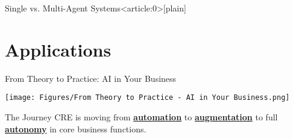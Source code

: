 \documentclass{beamer}
\begin{document}
    



{ %
    \begin{frame}{Single vs. Multi-Agent Systems}<article:0>[plain]
     \end{frame}
}




\section{Applications}

\begin{frame}{From Theory to Practice: AI in Your Business}
  \centering

  \centering
  \texttt{[image: Figures/From Theory to Practice - AI in Your Business.png]}\\
  

  \vspace{0.25cm}
  \begin{block}{The Journey}
    CRE is moving from \underline{\textbf{automation}}  to \underline{\textbf{augmentation}} to full
    \underline{\textbf{autonomy}} in core business functions.
  \end{block}
\end{frame}
\end{document}
